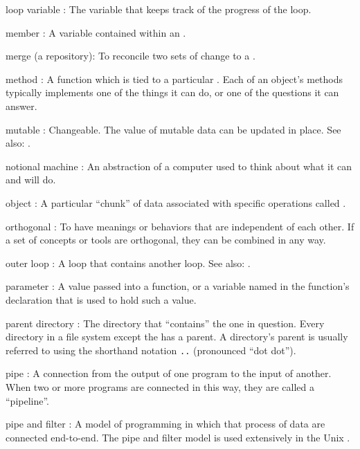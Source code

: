 \documentclass{book}
\begin{document}
\begin{swcdescription}
\item[loop variable]:
The variable that keeps track of the progress of
the loop.

\item[member]:
A variable contained within an
.

\item[merge] (a repository):
To reconcile two sets of change to a
.

\item[method]:
A function which is tied to a particular
. Each of an object's methods typically
implements one of the things it can do, or one of the questions it can
answer.

\item[mutable]:
Changeable. The value of mutable data can be updated
in place. See also: .

\item[notional machine]:
An abstraction of a computer used to think
about what it can and will do.

\item[object]:
A particular ``chunk'' of data associated with specific
operations called .

\item[orthogonal]:
To have meanings or behaviors that are independent
of each other. If a set of concepts or tools are orthogonal, they can be
combined in any way.

\item[outer loop]:
A loop that contains another loop. See also:
.

\item[parameter]:
A value passed into a function, or a variable named
in the function's declaration that is used to hold such a value.

\item[parent directory]:
The directory that ``contains'' the one in
question. Every directory in a file system except the
 has a parent. A directory's
parent is usually referred to using the shorthand notation \texttt{..}
(pronounced ``dot dot'').

\item[pipe]:
A connection from the output of one program to the input
of another. When two or more programs are connected in this way, they
are called a ``pipeline''.

\item[pipe and filter]:
A model of programming in which
 that process 
of data are connected end-to-end. The pipe and filter model is used
extensively in the Unix .


\end{swcdescription}
\end{document}
